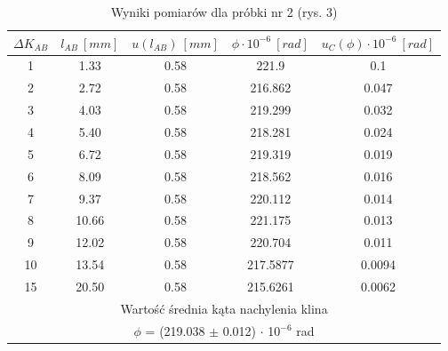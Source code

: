 \documentclass[12pt, a4paper, oneside]{article}
\begin{document}
\begin{table}[t]
  \centering
  \caption{Wyniki pomiarów dla próbki nr 2 (rys. 3)}
    \begin{tabular}{|c|c|c|c|c|}\hline
    $\Delta K_{AB}$ & $l_{AB}~[mm]$ & $u(l_{AB})~[mm]$ & $\phi\cdot 10^{-6}~[rad]$ & $u_C(\phi)\cdot 10^{-6}~[rad]$ \\\hline
    1 & 1.33 & 0.58 & 221.9 & 0.1 \\\hline
    2 & 2.72 & 0.58 & 216.862 & 0.047 \\\hline
    3 & 4.03 & 0.58 & 219.299 & 0.032 \\\hline
    4 & 5.40 & 0.58 & 218.281 & 0.024 \\\hline
    5 & 6.72 & 0.58 & 219.319 & 0.019 \\\hline
    6 & 8.09 & 0.58 & 218.562 & 0.016 \\\hline
    7 & 9.37 & 0.58 & 220.112 & 0.014 \\\hline
    8 & 10.66 & 0.58 & 221.175 & 0.013 \\\hline
    9 & 12.02 & 0.58 & 220.704 & 0.011 \\\hline
    10 & 13.54 & 0.58 & 217.5877 & 0.0094 \\\hline
    15 & 20.50 & 0.58 & 215.6261 & 0.0062 \\\hline
    \multicolumn{5}{|c|}{Wartość średnia kąta nachylenia klina} \\\hline
    \multicolumn{5}{|c|}{$\phi$ = (219.038 $\pm$ 0.012) $\cdot$ 10$^{-6}$ rad} \\\hline
    \end{tabular}%
  \label{tab:addlabel}%
\end{table}%
\end{document}
